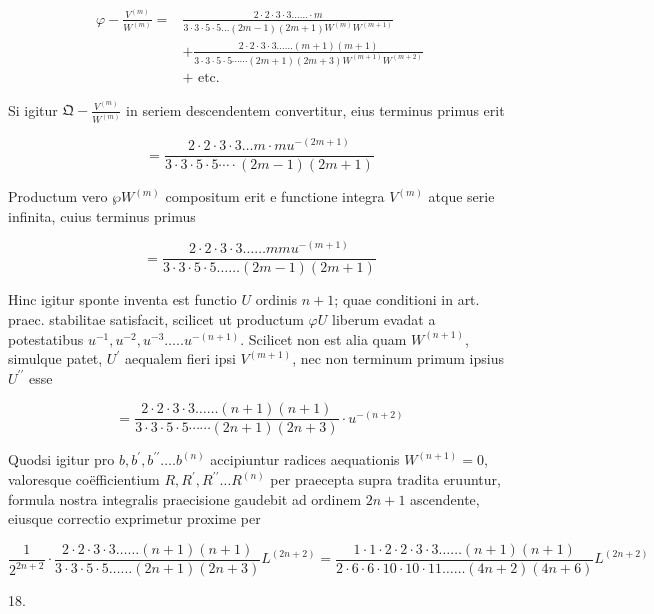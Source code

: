 \documentclass[10pt]{article}
\begin{document}
\[
\begin{aligned}
\varphi-\frac{V^{(m)}}{W^{(m)}}= & \frac{2 \cdot 2 \cdot 3 \cdot 3 \ldots \ldots \cdot m}{3 \cdot 3 \cdot 5 \cdot 5 \ldots(2 m-1)(2 m+1) W^{(m)} W^{(m+1)}} \\
& +\frac{2 \cdot 2 \cdot 3 \cdot 3 \ldots \ldots(m+1)(m+1)}{3 \cdot 3 \cdot 5 \cdot 5 \cdots \cdots(2 m+1)(2 m+3) W^{(m+1)} W^{(m+2)}} \\
& + \text { etc. }
\end{aligned}
\]

Si igitur \(\mathfrak{Q}-\frac{V^{(m)}}{W^{(m)}}\) in seriem descendentem convertitur, eius terminus primus erit

\[
=\frac{2 \cdot 2 \cdot 3 \cdot 3 \ldots m \cdot m u^{-(2 m+1)}}{3 \cdot 3 \cdot 5 \cdot 5 \cdots \cdot(2 m-1)(2 m+1)}
\]

Productum vero \(\wp W^{(m)}\) compositum erit e functione integra \(V^{(m)}\) atque serie infinita, cuius terminus primus

\[
=\frac{2 \cdot 2 \cdot 3 \cdot 3 \ldots \ldots m m u^{-(m+1)}}{3 \cdot 3 \cdot 5 \cdot 5 \ldots \ldots(2 m-1)(2 m+1)}
\]

Hinc igitur sponte inventa est functio \(U\) ordinis \(n+1\); quae conditioni in art. praec. stabilitae satisfacit, scilicet ut productum \(\varphi U\) liberum evadat a potestatibus \(u^{-1}, u^{-2}, u^{-3} \ldots . . u^{-(n+1)}\). Scilicet non est alia quam \(W^{(n+1)}\), simulque patet, \(U^{\prime}\) aequalem fieri ipsi \(V^{(m+1)}\), nec non terminum primum ipsius \(U^{\prime \prime}\) esse

\[
=\frac{2 \cdot 2 \cdot 3 \cdot 3 \ldots \ldots(n+1)(n+1)}{3 \cdot 3 \cdot 5 \cdot 5 \cdots \cdots(2 n+1)(2 n+3)} \cdot u^{-(n+2)}
\]

Quodsi igitur pro \(b, b^{\prime}, b^{\prime \prime} \ldots . b^{(n)}\) accipiuntur radices aequationis \(W^{(n+1)}=0\), valoresque coëfficientium \(R, R^{\prime}, R^{\prime \prime} \ldots R^{(n)}\) per praecepta supra tradita eruuntur, formula nostra integralis praecisione gaudebit ad ordinem \(2 n+1\) ascendente, eiusque correctio exprimetur proxime per

\[
\frac{1}{2^{2 n+2}} \cdot \frac{2 \cdot 2 \cdot 3 \cdot 3 \ldots \ldots(n+1)(n+1)}{3 \cdot 3 \cdot 5 \cdot 5 \ldots \ldots(2 n+1)(2 n+3)} L^{(2 n+2)}=\frac{1 \cdot 1 \cdot 2 \cdot 2 \cdot 3 \cdot 3 \ldots \ldots(n+1)(n+1)}{2 \cdot 6 \cdot 6 \cdot 10 \cdot 10 \cdot 11 \ldots \ldots(4 n+2)(4 n+6)} L^{(2 n+2)}
\]

18.
\end{document}
